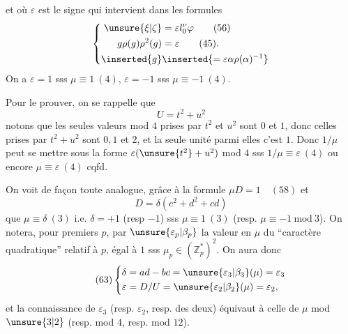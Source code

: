 et où $\varepsilon$ est le signe qui intervient dans les formules
\[
\left\{\begin{aligned}
\unsure{\xi|\zeta}&=\varepsilon l_0^\nu\varphi\qquad(56)\\
g\rho(g)\rho^2(g)&=\varepsilon\qquad(45).\\
\inserted{g}&\inserted{=\varepsilon\alpha\rho(\alpha)^{-1}}
\end{aligned}\right.
\]
On a $\varepsilon=1$ sss $\mu\equiv1\ (4)$, $\varepsilon=-1$ sss $\mu\equiv-1\ (4)$.


Pour le prouver, on se rappelle que
\[
U=t^2+u^2
\]
notons que les seules valeurs mod $4$ prises par $t^2$ et $u^2$ sont $0$ et $1$, donc celles prises par $t^2+u^2$ sont $0,1$ et $2$, et la seule unité parmi elles c'est $1$. Donc \deleted{\unsure{$\mu$}} $1/\mu$ peut se mettre sous la forme $\varepsilon(\unsure{t^2}+u^2)$ mod $4$ sss $1/\mu\equiv\varepsilon\ (4)$ ou encore $\mu\equiv\varepsilon\ (4)$ cqfd.

 On voit  de façon toute analogue, grâce à la formule $\mu D=1\quad(58)$ et
\[
D=\delta(c^2+d^2+cd)
\]
que $\mu\equiv\delta\ (3)$ i.e. $\delta=+1$ (resp $-1$) sss $\mu\equiv1\ (3)$ (resp. $\mu\equiv-1\ \mathrm{mod}\ 3$). On  notera, pour  premiers $p$, par $\unsure{\varepsilon_p|\beta_p}$ la valeur en $\mu$ du ``caractère quadratique'' relatif à $p$, égal à $1$ sss $\mu_p\in(\mathbb Z_p^*)^2$. On aura donc
\[
\tag{63}
\left\{\begin{aligned}
\delta&=ad-bc=\unsure{\varepsilon_3|\beta_3}(\mu)=\varepsilon_3\\
\varepsilon&=D/U=\unsure{\varepsilon_2|\beta_2}(\mu)=\varepsilon_2,
\end{aligned}\right.
\]
et la connaissance de $\varepsilon_3$ (resp. $\varepsilon_2$, resp. des deux) équivaut à celle de $\mu$ mod $\unsure{3|2}$ (resp. mod $4$, resp. mod $12$).

